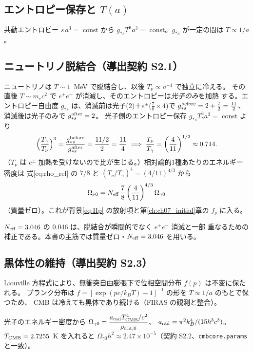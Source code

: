 \subsection{エントロピー保存と $T(a)$}
共動エントロピー $s\,a^3=$ const から $g_{*s}T^3a^3=$ const。$g_{*s}$ が一定の間は
$T\propto1/a$。

\subsection{ニュートリノ脱結合（導出契約 S2.1）}
ニュートリノは $T\sim1$~MeV で脱結合し、以後 $T_\nu\propto a^{-1}$ で独立に冷える。
その直後 $T\sim m_ec^2$ で $e^+e^-$ が消滅し、そのエントロピーは\emph{光子のみ}を加熱
する。エントロピー自由度 $g_{*s}$ は、消滅前は光子($2$)＋$e^\pm$($\tfrac78\times4$)で
$g_{*s}^{\rm before}=2+\tfrac72=\tfrac{11}{2}$、消滅後は光子のみで $g_{*s}^{\rm after}=2$。
光子側のエントロピー保存 $g_{*s}T_\gamma^3a^3=$ const より
\begin{equation}
  \Big(\frac{T_\gamma}{T_\nu}\Big)^3=\frac{g_{*s}^{\rm before}}{g_{*s}^{\rm after}}
  =\frac{11/2}{2}=\frac{11}{4}
  \;\Longrightarrow\;
  \frac{T_\nu}{T_\gamma}=\left(\frac{4}{11}\right)^{1/3}\approx0.714.
  \label{eq:Tnu}
\end{equation}
（$T_\nu$ は $e^\pm$ 加熱を受けないので比が生じる。）相対論的1種あたりのエネルギー密度は
式\eqref{eq:rho_rel} の $7/8$ と $(T_\nu/T_\gamma)^4=(4/11)^{4/3}$ から
\begin{equation}
  \Omega_{\nu0}=N_{\rm eff}\,\frac{7}{8}\left(\frac{4}{11}\right)^{4/3}\Omega_{\gamma0}
\end{equation}
（質量ゼロ）。これが背景\eqref{eq:Hp} の放射項と第\ref{ch:ch07_initial}章の $f_\nu$ に入る。

\begin{advanced}
$N_{\rm eff}=3.046$ の $0.046$ は、脱結合が瞬間的でなく $e^+e^-$ 消滅と一部
重なるための補正である。本書の主筋では質量ゼロ・$N_{\rm eff}=3.046$ を用いる。
\end{advanced}

\subsection{黒体性の維持（導出契約 S2.3）}
Liouville 方程式により、無衝突自由膨張下で位相空間分布 $f(p)$ は不変に保たれる。
プランク分布は $f=[\exp(pc/k_BT)-1]^{-1}$ の形を $T\propto1/a$ のもとで保つため、
CMB は冷えても黒体であり続ける（FIRAS の観測と整合）。

\begin{numreality}
光子のエネルギー密度から $\Omega_{\gamma0}=\dfrac{a_{\rm rad}T_{\rm CMB}^4/c^2}{\rho_{\rm crit,0}}$、
$a_{\rm rad}=\pi^2k_B^4/(15\hbar^3c^3)$。$T_{\rm CMB}=2.7255$~K を入れると
$\Omega_{\gamma0}h^2\approx2.47\times10^{-5}$（契約 S2.2、\texttt{cmbcore.params} と一致）。
\end{numreality}

